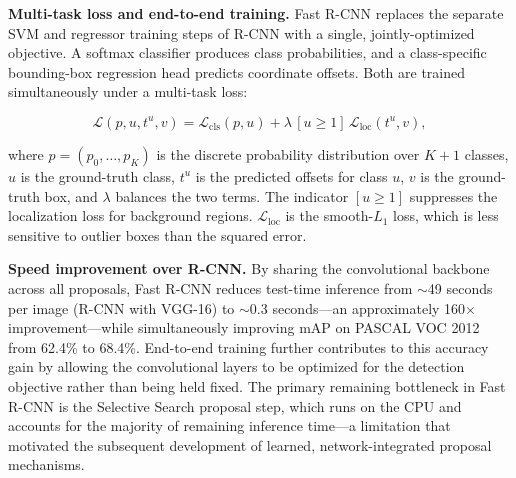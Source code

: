 \textbf{Multi-task loss and end-to-end training.}
Fast R-CNN replaces the separate SVM and regressor training steps
of R-CNN with a single, jointly-optimized objective. A softmax
classifier produces class probabilities, and a class-specific
bounding-box regression head predicts coordinate offsets. Both
are trained simultaneously under a multi-task loss:

\begin{equation}
    \mathcal{L}(p, u, t^{u}, v) =
    \mathcal{L}_{\text{cls}}(p, u)
    + \lambda \, [u \geq 1] \, \mathcal{L}_{\text{loc}}(t^{u}, v),
    \label{eq:fast_rcnn_loss}
\end{equation}

\noindent
where $p = (p_0, \ldots, p_K)$ is the discrete probability
distribution over $K+1$ classes, $u$ is the ground-truth class,
$t^u$ is the predicted offsets for class $u$, $v$ is the
ground-truth box, and $\lambda$ balances the two terms.
The indicator $[u \geq 1]$ suppresses the localization loss for
background regions. $\mathcal{L}_{\text{loc}}$ is the smooth-$L_1$
loss, which is less sensitive to outlier boxes than the squared
error.

\textbf{Speed improvement over R-CNN.}
By sharing the convolutional backbone across all proposals, Fast
R-CNN reduces test-time inference from $\sim$49 seconds per image
(R-CNN with VGG-16) to $\sim$0.3 seconds---an approximately
160$\times$ improvement---while simultaneously improving mAP on
PASCAL VOC 2012 from 62.4\% to 68.4\%. End-to-end training
further contributes to this accuracy gain by allowing the
convolutional layers to be optimized for the detection objective
rather than being held fixed. The primary remaining bottleneck
in Fast R-CNN is the Selective Search proposal step, which runs
on the CPU and accounts for the majority of remaining inference
time---a limitation that motivated the subsequent development of
learned, network-integrated proposal mechanisms.

